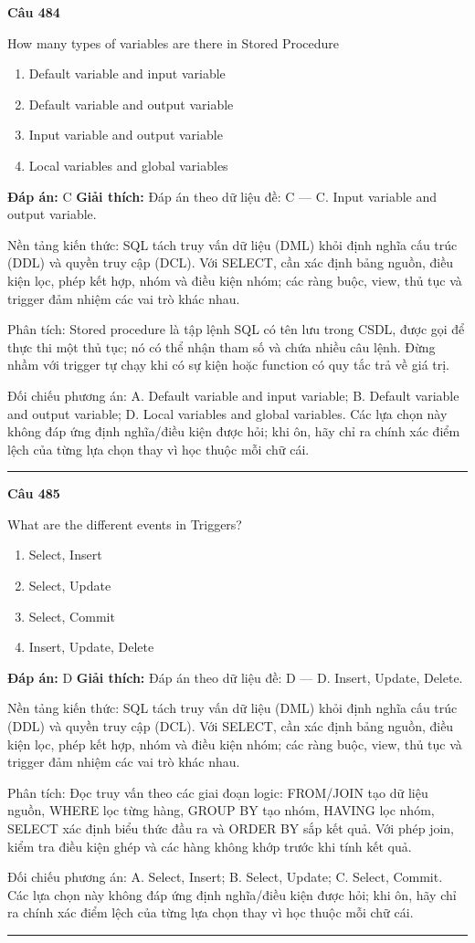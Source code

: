 \documentclass[11pt,a4paper]{article}
\newenvironment{question}[1]{%
  \par\vspace{1em}\noindent\textbf{\large Câu #1}\par\vspace{0.4em}
}{%
  \par\vspace{1em}\hrule\vspace{0.6em}
}
\newenvironment{choices}{%
  \begin{enumerate}[label=\textbf{\Alph*.},leftmargin=2.2em,itemsep=2pt,topsep=3pt]
}{%
  \end{enumerate}
}
\newcommand{\choice}{\item}
\begin{document}
\begin{question}{484}
How many types of variables are there in Stored Procedure
\begin{choices}
\choice Default variable and input variable
\choice Default variable and output variable
\choice Input variable and output variable
\choice Local variables and global variables
\end{choices}
\textbf{Đáp án:} C
\textbf{Giải thích:} Đáp án theo dữ liệu đề: C — C. Input variable and output variable.

Nền tảng kiến thức: SQL tách truy vấn dữ liệu (DML) khỏi định nghĩa cấu trúc (DDL) và quyền truy cập (DCL). Với SELECT, cần xác định bảng nguồn, điều kiện lọc, phép kết hợp, nhóm và điều kiện nhóm; các ràng buộc, view, thủ tục và trigger đảm nhiệm các vai trò khác nhau.

Phân tích: Stored procedure là tập lệnh SQL có tên lưu trong CSDL, được gọi để thực thi một thủ tục; nó có thể nhận tham số và chứa nhiều câu lệnh. Đừng nhầm với trigger tự chạy khi có sự kiện hoặc function có quy tắc trả về giá trị.

Đối chiếu phương án: A. Default variable and input variable; B. Default variable and output variable; D. Local variables and global variables. Các lựa chọn này không đáp ứng định nghĩa/điều kiện được hỏi; khi ôn, hãy chỉ ra chính xác điểm lệch của từng lựa chọn thay vì học thuộc mỗi chữ cái.
\end{question}

\begin{question}{485}
What are the different events in Triggers?
\begin{choices}
\choice Select, Insert
\choice Select, Update
\choice Select, Commit
\choice Insert, Update, Delete
\end{choices}
\textbf{Đáp án:} D
\textbf{Giải thích:} Đáp án theo dữ liệu đề: D — D. Insert, Update, Delete.

Nền tảng kiến thức: SQL tách truy vấn dữ liệu (DML) khỏi định nghĩa cấu trúc (DDL) và quyền truy cập (DCL). Với SELECT, cần xác định bảng nguồn, điều kiện lọc, phép kết hợp, nhóm và điều kiện nhóm; các ràng buộc, view, thủ tục và trigger đảm nhiệm các vai trò khác nhau.

Phân tích: Đọc truy vấn theo các giai đoạn logic: FROM/JOIN tạo dữ liệu nguồn, WHERE lọc từng hàng, GROUP BY tạo nhóm, HAVING lọc nhóm, SELECT xác định biểu thức đầu ra và ORDER BY sắp kết quả. Với phép join, kiểm tra điều kiện ghép và các hàng không khớp trước khi tính kết quả.

Đối chiếu phương án: A. Select, Insert; B. Select, Update; C. Select, Commit. Các lựa chọn này không đáp ứng định nghĩa/điều kiện được hỏi; khi ôn, hãy chỉ ra chính xác điểm lệch của từng lựa chọn thay vì học thuộc mỗi chữ cái.
\end{question}
\end{document}
